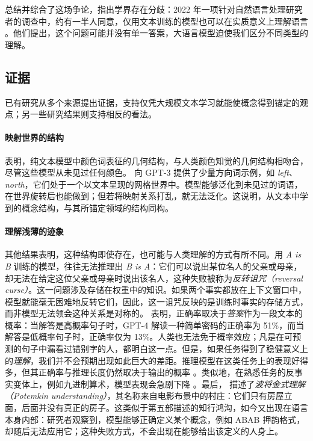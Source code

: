 \citet{mitchell2023debate} 总结并综合了这场争论，指出学界存在分歧：2022 年一项针对自然语言处理研究者的调查中，约有一半人同意，仅用文本训练的模型也可以在实质意义上理解语言 \citep{michael2022what}。他们提出，这个问题可能并没有单一答案，大语言模型迫使我们区分不同类型的理解。

\subsection{证据}
已有研究从多个来源提出证据，支持仅凭大规模文本学习就能使概念得到锚定的观点；另一些研究结果则支持相反的看法。

\paragraph{映射世界的结构}
\citet{abdou2021language} 表明，纯文本模型中颜色词表征的几何结构，与人类颜色知觉的几何结构相吻合，尽管这些模型从未见过任何颜色。\citet{patel2022mapping} 向 GPT-3 提供了少量方向词示例，如 {\em left}、{\em north}，它们处于一个以文本呈现的网格世界中。模型能够泛化到未见过的词语，在世界旋转后也能做到；但若将映射关系打乱，就无法泛化。这说明，从文本中学到的概念结构，与其所锚定领域的结构同构。

\paragraph{理解浅薄的迹象}
其他结果表明，这种结构即使存在，也可能与人类理解的方式有所不同。用 {\em A is B} 训练的模型，往往无法推理出 {\em B is A}：它们可以说出某位名人的父亲或母亲，却无法在给定这位父亲或母亲时说出该名人，这种失败被称为\emph{反转诅咒（reversal curse）}\citep{berglund2024reversalcurse}。这一问题涉及存储在权重中的知识。如果两个事实都放在上下文窗口中，模型就能毫无困难地反转它们，因此，这一诅咒反映的是训练时事实的存储方式，而非模型无法领会这种关系是对称的。\citet{mccoy2024embers} 表明，正确率取决于\emph{答案}作为一段文本的概率：当解答是高概率句子时，GPT-4 解读一种简单密码的正确率为 51\%，而当解答是低概率句子时，正确率仅为 13\%。人类也无法免于概率效应；凡是在可预测的句子中漏看过错别字的人，都明白这一点。但是，如果任务得到了稳健意义上的\emph{理解}，我们并不会预期出现如此巨大的差距。推理模型在这类任务上的表现好得多，但其正确率与推理长度仍然取决于输出的概率 \citep{mccoy2024o1}。类似地，在熟悉任务的反事实变体上，例如九进制算术，模型表现会急剧下降 \citep{wu2024reasoning}。最后，\citet{mancoridis2025potemkin} 描述了\emph{波将金式理解（Potemkin understanding）}，其名称来自电影布景中的村庄：它们只有房屋立面，后面并没有真正的房子。这类似于第五部描述的知行鸿沟，如今又出现在语言本身内部：研究者观察到，模型能够正确定义某个概念，例如 ABAB 押韵格式，却随后无法应用它；这种失败方式，不会出现在能够给出该定义的人身上。

